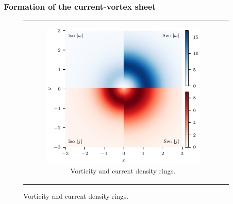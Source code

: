\subsubsection{Formation of the current-vortex sheet}

\begin{figure}[t]
  \centering
    \begin{tabular}[t]{cc}
    \begin{subfigure}{0.49\textwidth}
      \includegraphics[width=\linewidth]{v-4r-4_vorticity_current_ring_t_3}
      \caption{Vorticity and current density rings.}
      \label{fig:v-4r-4_vorticity_current_ring_t_3}
    \end{subfigure}


\end{tabular}
\end{figure}
